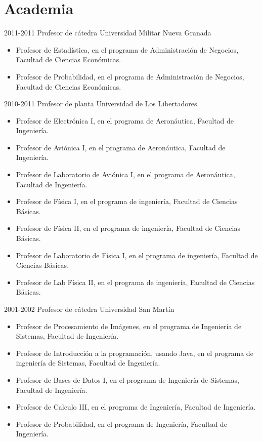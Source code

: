 \section{Academia}

\begin{entrylist}
  \entry
	{2011-2011}
	{Profesor de cátedra}
	{Universidad Militar Nueva Granada}
	{\begin{itemize}
	    \item Profesor de Estadística, en el programa de Administración de Negocios, Facultad
		    de Ciencias Económicas.
            \item Profesor de Probabilidad, en el programa de Administración de Negocios, Facultad
		    de Ciencias Económicas.
	\end{itemize}}
  \entry
	{2010-2011}
	{Profesor de planta}
	{Universidad de Los Libertadores}
	{\begin{itemize}
              \item Profesor de Electrónica I, en el programa de Aeronáutica, Facultad de
		      Ingeniería.
              \item Profesor de Aviónica I, en el programa de Aeronáutica, Facultad de
		      Ingeniería.
              \item Profesor de Laboratorio de Aviónica I, en el programa de Aeronáutica, Facultad de
		      Ingeniería.
              \item Profesor de Física I, en el programa de ingeniería, Facultad de
		      Ciencias Básicas.
              \item Profesor de Física II, en el programa de ingeniería, Facultad de
		      Ciencias Básicas.
              \item Profesor de Laboratorio de Física I, en el programa de ingeniería, Facultad de
		      Ciencias Básicas.
              \item Profesor de Lab Física II, en el programa de ingeniería, Facultad de
		      Ciencias Básicas.
	\end{itemize}}

  \entry
        {2001-2002}
	{Profesor de cátedra}
	{Universidad San Martín}
	{\begin{itemize}
              \item Profesor de Procesamiento de Imágenes, en el programa de Ingeniería de Sistemas,
Facultad de Ingeniería.
              \item Profesor de Introducción a la programación, usando Java, en el programa de
		      ingeniería de Sistemas, Facultad de Ingeniería.
              \item Profesor de Bases de Datos I, en el programa de Ingeniería de Sistemas, Facultad
		      de Ingeniería.
              \item Profesor de Calculo III, en el programa de Ingeniería, Facultad de Ingeniería.
              \item Profesor de Probabilidad, en el programa de Ingeniería, Facultad de Ingeniería.
	\end{itemize}}
\end{entrylist}

